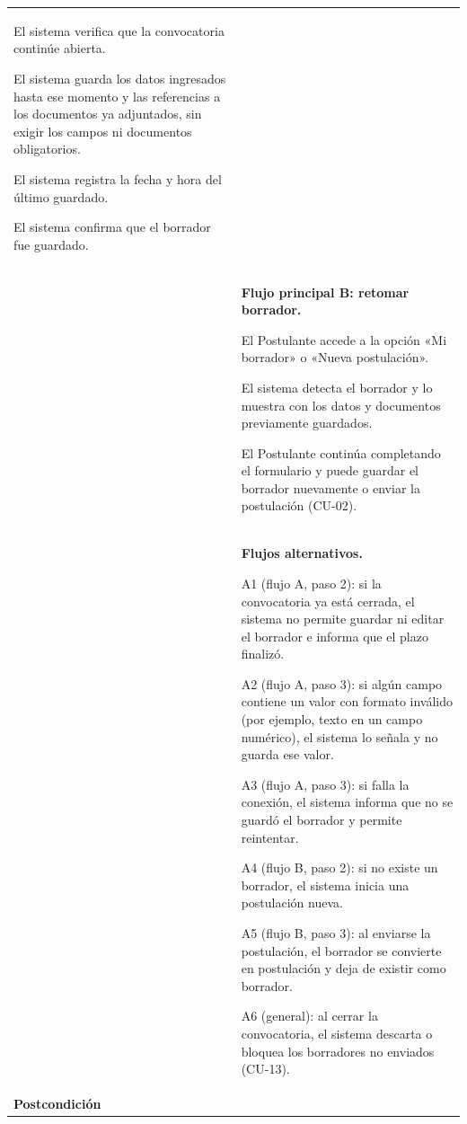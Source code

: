 \begin{longtable}{>{\raggedright\arraybackslash}p{2.9cm} >{\raggedright\arraybackslash}p{12.6cm}}
\begin{cupasos}
    \item El sistema verifica que la convocatoria continúe abierta.
    \item El sistema guarda los datos ingresados hasta ese momento y las referencias a los documentos ya adjuntados, sin exigir los campos ni documentos obligatorios.
    \item El sistema registra la fecha y hora del último guardado.
    \item El sistema confirma que el borrador fue guardado.
\end{cupasos} \\
 & \textbf{Flujo principal B: retomar borrador.}
\begin{cupasos}
    \item El Postulante accede a la opción «Mi borrador» o «Nueva postulación».
    \item El sistema detecta el borrador y lo muestra con los datos y documentos previamente guardados.
    \item El Postulante continúa completando el formulario y puede guardar el borrador nuevamente o enviar la postulación (CU-02).
\end{cupasos} \\
 & \textbf{Flujos alternativos.}
\begin{cuvin}
    \item A1 (flujo A, paso 2): si la convocatoria ya está cerrada, el sistema no permite guardar ni editar el borrador e informa que el plazo finalizó.
    \item A2 (flujo A, paso 3): si algún campo contiene un valor con formato inválido (por ejemplo, texto en un campo numérico), el sistema lo señala y no guarda ese valor.
    \item A3 (flujo A, paso 3): si falla la conexión, el sistema informa que no se guardó el borrador y permite reintentar.
    \item A4 (flujo B, paso 2): si no existe un borrador, el sistema inicia una postulación nueva.
    \item A5 (flujo B, paso 3): al enviarse la postulación, el borrador se convierte en postulación y deja de existir como borrador.
    \item A6 (general): al cerrar la convocatoria, el sistema descarta o bloquea los borradores no enviados (CU-13).
\end{cuvin} \\
\midrule
\textbf{Postcondición} & \vspace{-\baselineskip}\begin{cuvin}

\end{cuvin}
\end{longtable}
